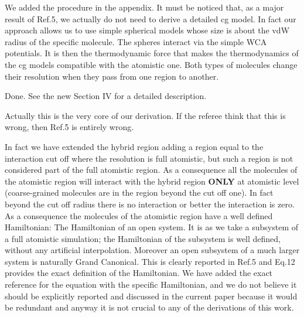 \documentclass[12pt]{article}
\begin{document}
We added the procedure in the appendix. It must be noticed that, as a
major result of Ref.5, we actually do not need to derive a detailed cg
model. In fact our approach allows us to use simple spherical models
whose size is about the vdW radius of the specific molecule. The spheres
interact via the simple WCA potentials. It is then the thermodynamic force
that makes the thermodynamics of the cg models compatible with the
atomistic one. Both types of molecules change their resolution when they pass from
one region to another.

{}

Done. See the new Section IV for a detailed description.

{\color{blue}{\it (3) Figure 1. ``allows to write an exact Hamiltonian for the atomistic region and thus treat the system in a GC fashion.'' This phrase is
difficult to understand. The AT region is connected with the CG domain (via a transition layer which is not small, but much thicker than the
molecular size). Thus either one has a complete Hamiltonian for the whole AT+HYB+CG system, or else, there is no Hamiltonian. In other words, if
the interactions between AT and HYB, and CG molecules are not derived from H, then there is no Hamiltonian. Also, ``...treat the system in a GC
fashion'' is also difficult to understand (maybe the authors mean ``...consider the AT region as an open subsystem''). I would suggest
deleting this phrase and refer in the text to their theoretical findings in Ref. 5 about particle number distributions p(N),etc.}}

Actually this is the very core of our derivation. If the referee think that this is wrong, then Ref.5 is entirely wrong.

In fact we have extended the hybrid region adding a region equal to
the interaction cut off where the resolution is full atomistic, but
such a region is not considered part of the full atomistic region. As
a consequence all the molecules of the atomistic region will interact
with the hybrid region {\bf ONLY} at atomistic level (coarse-grained
molecules are in the region beyond the cut off one). In fact beyond
the cut off radius there is no interaction or better the interaction
is zero. As a consequence the molecules of the atomistic region have a
well defined Hamiltonian: The Hamiltonian of an open system.
It is as we take a subsystem of a full atomistic simulation; the Hamiltonian of the subsystem is well defined, without any artificial interpolation.
Moreover an open subsystem of a much larger system is naturally Grand Canonical.
This is clearly reported in Ref.5 and Eq.12 provides the exact definition of the Hamiltonian.
We have added the exact reference for the equation with the specific Hamiltonian, and we do not believe it should be explicitly reported and discussed in the current paper because it would be redundant and anyway it is not crucial to any of the derivations of this work.
\end{document}
